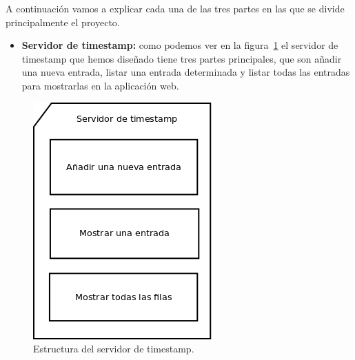 A continuación vamos a explicar cada una de las tres partes en las que se divide principalmente el proyecto.

\begin{itemize}
\item \textbf{Servidor de timestamp:} como podemos ver en la figura~\ref{fig:servertimestamp} el servidor de timestamp que hemos diseñado tiene tres partes principales, que son añadir una nueva entrada, listar una entrada determinada y listar todas las entradas para mostrarlas en la aplicación web.  
\end{itemize}

\begin{figure}
  \centering
    \includegraphics[scale=0.3]{./DisenhoYArquitectura/imagenes/servertimestamp.png}
  \caption{Estructura del servidor de timestamp.}
  \label{fig:servertimestamp}
\end{figure}

